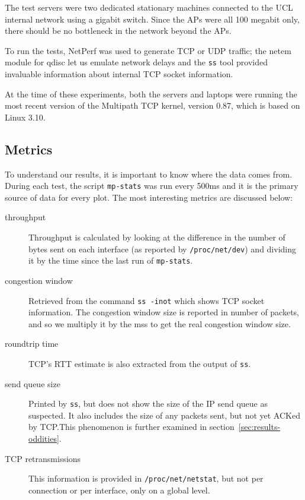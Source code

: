 The test servers were two dedicated stationary machines connected to the UCL
internal network using a gigabit switch. Since the APs were all 100 megabit
only, there should be no bottleneck in the network beyond the APs.

To run the tests, NetPerf was used to generate TCP or UDP traffic; the netem
module for qdisc let us emulate network delays and the \texttt{ss} tool provided
invaluable information about internal TCP socket information.

At the time of these experiments, both the servers and laptops were running the
most recent version of the Multipath TCP kernel, version 0.87, which is based
on Linux 3.10.

\subsection{Metrics}
\label{sec:met:metrics}
To understand our results, it is important to know where the data comes from.
During each test, the script \texttt{mp-stats} was run every 500ms and it is the
primary source of data for every plot. The most interesting metrics are
discussed below:

\begin{description}
  \item[throughput]
    Throughput is calculated by looking at the difference in the number of bytes
    sent on each interface (as reported by \texttt{/proc\-/net/\-dev}) and
    dividing it by the time since the last run of \texttt{mp-stats}.
  \item[congestion window]
    Retrieved from the command \texttt{ss -inot} which shows TCP socket
    information. The congestion window size is reported in number of packets,
    and so we multiply it by the mss to get the real congestion window size.
  \item[roundtrip time]
    TCP's RTT estimate is also extracted from the output of \texttt{ss}.
  \item[send queue size]
    Printed by \texttt{ss}, but does not show the size of the IP send queue as
    suspected. It also includes the size of any packets sent, but not yet ACKed
    by TCP.\@ This phenomenon is further examined in
    section~\ref{sec:results-oddities}.
  \item[TCP retransmissions]
    This information is provided in \texttt{/proc\-/net/\-netstat}, but not per
    connection or per interface, only on a global level.
\end{description}

